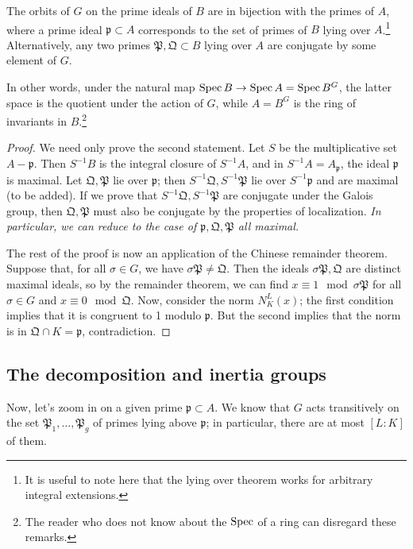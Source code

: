 \begin{proposition} The orbits of $G$ on the prime ideals of $B$ are in bijection with the primes of $A$, where a prime ideal $\mathfrak{p} \subset A$ corresponds to the set of primes of $B$ lying over $A$.\footnote{It is useful to note here that the lying over theorem works for arbitrary integral extensions.}  Alternatively, any two primes $\mathfrak{P}, \mathfrak{Q} \subset B$ lying over $A$ are conjugate by some element of $G$.
\end{proposition}

In other words, under the natural map $\operatorname{Spec} B \to \operatorname{Spec} A =\operatorname{Spec} B^G$, the latter space is the quotient under the action of $G$, while $A=B^G$ is the ring of invariants in $B$.\footnote{The reader who does not know about the $\operatorname{Spec}$ of a ring can disregard these remarks.}

\begin{proof} 
We need only prove the second statement. 
Let $S$ be the multiplicative set $A - \mathfrak{p}$.  Then $S^{-1}B $ is the integral closure of $S^{-1}A$, and in $S^{-1}A = A_{\mathfrak{p}}$, the ideal $\mathfrak{p}$ is maximal. 
Let $\mathfrak{Q}, \mathfrak{P}$ lie over $\mathfrak{p}$; then $S^{-1}\mathfrak{Q},S^{-1} \mathfrak{P}$  lie over $S^{-1}\mathfrak{p}$ and are maximal (to be added).  If we prove that $S^{-1} \mathfrak{Q}, S^{-1} \mathfrak{P}$ are conjugate under the Galois group, then $\mathfrak{Q}, \mathfrak{P}$ must also be conjugate by the properties of localization.  \emph{In particular, we can reduce to the case of $\mathfrak{p}, \mathfrak{Q}, \mathfrak{P}$ all maximal.}

The rest of the proof is now an application of the Chinese remainder theorem.  Suppose that, for all $\sigma \in G$, we have $\sigma \mathfrak{P} \neq \mathfrak{Q}$.  Then the ideals $\sigma \mathfrak{P}, \mathfrak{Q}$ are distinct maximal ideals, so by the remainder theorem, we can find $x \equiv 1 \mod \sigma \mathfrak{P}$ for all $\sigma \in G$ and $x \equiv  0 \mod \mathfrak{Q}$.
Now, consider the norm $N^L_K(x)$; the first condition implies that it is congruent to 1 modulo $\mathfrak{p}$.  But the second implies that  the norm is in $\mathfrak{Q} \cap K = \mathfrak{p}$, contradiction.
\end{proof}

\newcommand{\ol}[1]{\overline{#1}}
\subsection{The decomposition and inertia groups}
Now, let's zoom in on a given prime $\mathfrak{p} \subset A$.  We know that $G$ acts transitively on the set $\mathfrak{P}_1, \dots, \mathfrak{P}_g$ of primes lying above $\mathfrak{p}$; in particular, there are at most $[L:K]$ of them.  

